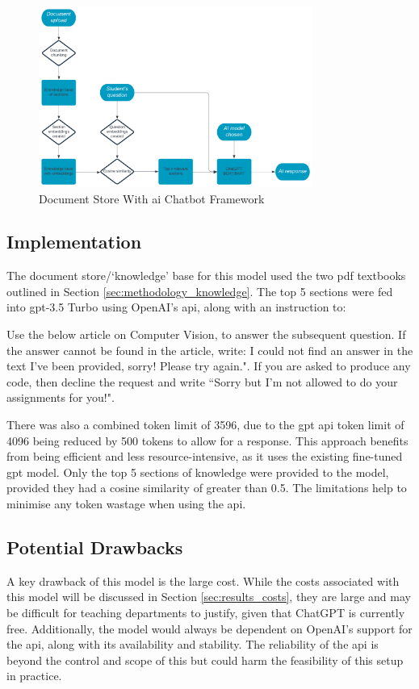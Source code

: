 \begin{figure}[h!]
    \centering
    \includegraphics[width=0.8\textwidth]{images/framework.png}
    \caption{Document Store With \acrshort{ai} Chatbot Framework}
    \label{fig:initial_framework}
\end{figure}

\subsection{Implementation}
The document store/`knowledge' base for this model used the two \acrshort{pdf} textbooks outlined in Section \ref{sec:methodology_knowledge}. The top 5 sections were fed into \acrshort{gpt}-3.5 Turbo using OpenAI's \acrshort{api}, along with an instruction to:
\begin{itquote}
    Use the below article on Computer Vision, to answer the subsequent question. If the answer cannot be found in the article, write: I could not find an answer in the text I've been provided, sorry! Please try again.". If you are asked to produce any code, then decline the request and write ``Sorry but I'm not allowed to do your assignments for you!".
\end{itquote}
There was also a combined token limit of 3596, due to the \acrshort{gpt} \acrshort{api} token limit of 4096 being reduced by 500 tokens to allow for a response. This approach benefits from being efficient and less resource-intensive, as it uses the existing fine-tuned \acrshort{gpt} model. Only the top 5 sections of knowledge were provided to the model, provided they had a cosine similarity of greater than 0.5. The limitations help to minimise any token wastage when using the \acrshort{api}.

\subsection{Potential Drawbacks}
A key drawback of this model is the large cost. While the costs associated with this model will be discussed in Section \ref{sec:results_costs}, they are large and may be difficult for teaching departments to justify, given that ChatGPT is currently free. Additionally, the model would always be dependent on OpenAI's support for the \acrshort{api}, along with its availability and stability. The reliability of the \acrshort{api} is beyond the control and scope of this \papertype but could harm the feasibility of this setup in practice.


